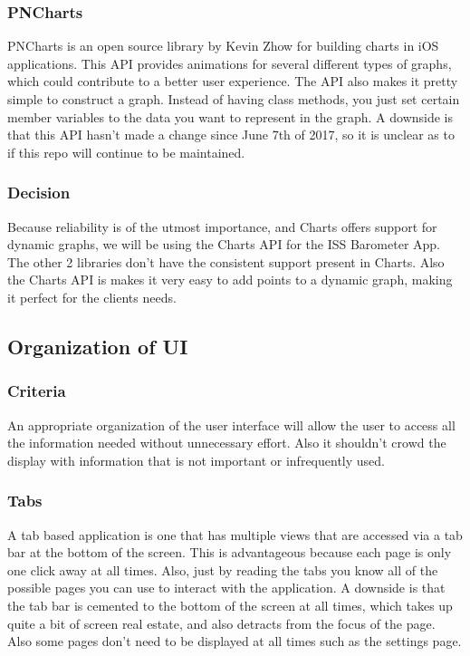 \documentclass[onecolumn, draftclsnofoot,10pt, compsoc]{IEEEtran}
\begin{document}
\subsubsection{PNCharts}
PNCharts is an open source library by Kevin Zhow for building charts in iOS applications.
This API provides animations for several different types of graphs, which could contribute to a better user experience.
The API also makes it pretty simple to construct a graph.
Instead of having class methods, you just set certain member variables to the data you want to represent in the graph.
A downside is that this API hasn't made a change since June 7th of 2017, so it is unclear as to if this repo will continue to be maintained.

\subsubsection{Decision}
Because reliability is of the utmost importance, and Charts offers support for dynamic graphs, we will be using the Charts API for the ISS Barometer App. The other 2 libraries don't have the consistent support present in Charts.
Also the Charts API is makes it very easy to add points to a dynamic graph, making it perfect for the clients needs.

\subsection{Organization of UI}
\subsubsection{Criteria}
An appropriate organization of the user interface will allow the user to access all the information needed without unnecessary effort. Also it shouldn't crowd the display with information that is not important or infrequently used.

\subsubsection{Tabs}
A tab based application is one that has multiple views that are accessed via a tab bar at the bottom of the screen.
This is advantageous because each page is only one click away at all times.
Also, just by reading the tabs you know all of the possible pages you can use to interact with the application.
A downside is that the tab bar is cemented to the bottom of the screen at all times, which takes up quite a bit of screen real estate, and also detracts from the focus of the page.
Also some pages don't need to be displayed at all times such as the settings page.
\end{document}
